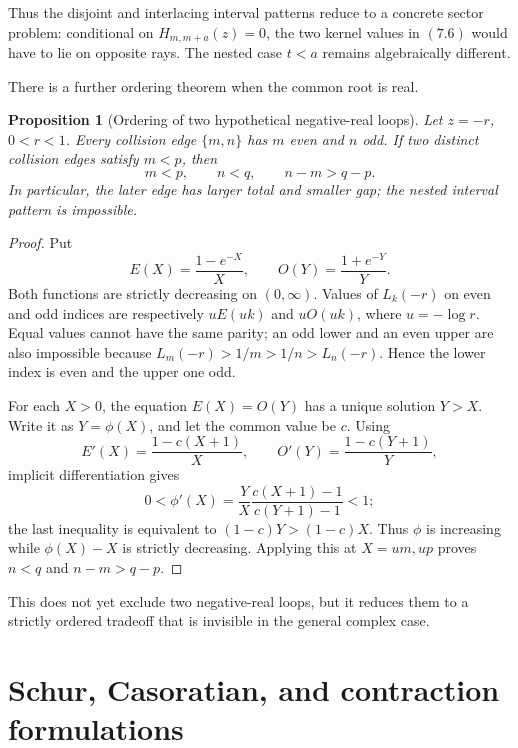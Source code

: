 \documentclass[11pt]{article}
\newtheorem{proposition}[theorem]{Proposition}
\theoremstyle{definition}
\begin{document}
Thus the disjoint and interlacing interval patterns reduce to a concrete
sector problem: conditional on \(H_{m,m+a}(z)=0\), the two kernel values in
\((7.6)\) would have to lie on opposite rays.  The nested case \(t<a\)
remains algebraically different.

There is a further ordering theorem when the common root is real.

\begin{proposition}[Ordering of two hypothetical negative-real loops]
\label{prop:negativeorder}
Let \(z=-r\), \(0<r<1\).  Every collision edge \(\{m,n\}\) has
\(m\) even and \(n\) odd.  If two distinct collision edges satisfy
\(m<p\), then
\begin{equation}
 m<p,\qquad n<q,\qquad n-m>q-p.
 \tag{7.8}
\end{equation}
In particular, the later edge has larger total and smaller gap; the nested
interval pattern is impossible.
\end{proposition}

\begin{proof}
Put
\[
 E(X)=\frac{1-e^{-X}}{X},\qquad
 O(Y)=\frac{1+e^{-Y}}{Y}.
\]
Both functions are strictly decreasing on \((0,\infty)\).  Values of
\(L_k(-r)\) on even and odd indices are respectively
\(uE(uk)\) and \(uO(uk)\), where \(u=-\log r\).  Equal values cannot have
the same parity; an odd lower and an even upper are also impossible because
\(L_m(-r)>1/m>1/n>L_n(-r)\).  Hence the lower index is even and the upper
one odd.

For each \(X>0\), the equation \(E(X)=O(Y)\) has a unique solution
\(Y>X\).  Write it as \(Y=\phi(X)\), and let the common value be \(c\).
Using
\[
 E'(X)=\frac{1-c(X+1)}{X},\qquad
 O'(Y)=\frac{1-c(Y+1)}{Y},
\]
implicit differentiation gives
\[
 0<\phi'(X)
 =\frac{Y}{X}\frac{c(X+1)-1}{c(Y+1)-1}<1;
\]
the last inequality is equivalent to
\((1-c)Y>(1-c)X\).  Thus \(\phi\) is increasing while
\(\phi(X)-X\) is strictly decreasing.  Applying this at
\(X=um,up\) proves \(n<q\) and \(n-m>q-p\).
\end{proof}

This does not yet exclude two negative-real loops, but it reduces them to a
strictly ordered tradeoff that is invisible in the general complex case.

\section{Schur, Casoratian, and contraction formulations}
\label{sec:schur}
\end{document}
